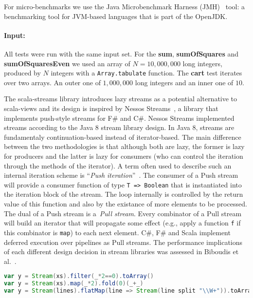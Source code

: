 For micro-benchmarks we use the Java Microbenchmark Harness
(JMH)~\cite{aleksey_shipilev_openjdk:_????} tool: a benchmarking tool for
JVM-based languages that is part of the OpenJDK.

\paragraph{Input:} All tests were run with the same input set. For the
\textbf{sum}, \textbf{sumOfSquares} and \textbf{sumOfSquaresEven} we used an
array of $N = 10,000,000$ long integers, produced by $N$ integers with a
\verb|Array.tabulate| function. The \textbf{cart} test iterates over two
arrays. An outer one of $1,000,000$ long integers and an inner one of $10$.

The scala-streams library introduces lazy streams as a potential alternative to
scala-views and its design is inspired by Nessos Streams~\cite{nessos_streams},
a library that implements push-style streams for F\# and C\#. Nessos Streams
implemented streams according to the Java 8 stream library design. In Java 8,
streams are fundamentaly continuation-based instead of iterator-based. The main
difference between the two methodologies is that although both are lazy, the
former is lazy for producers and the latter is lazy for consumers (who can
control the iteration through the methods of the iterator). A term often used to
describe such an internal iteration scheme is ``\emph{Push
  iteration}''~\cite{obsidian,defuncpush}.  The consumer of a Push stream will
provide a consumer function of type \verb|T => Boolean| that is instantiated
into the iteration block of the stream. The loop internally is controlled by the
return value of this function and also by the existance of more elements to be
processed. The dual of a Push stream is a~\emph{Pull stream}. Every combinator
of a Pull stream will build an iterator that will propagate some effect (e.g.,
apply a function \verb|f| if this combinator is \verb|map|) to each next
element. C\#, F\# and Scala implement deferred execution over pipelines as Pull
streams. The performance implications of each different design decision in
stream libraries was assessed in Biboudis et al.~\cite{biboudis_clash_2014}.

\begin{lstlisting}[language=Scala, caption=Example uses of scala-streams.]
var y = Stream(xs).filter(_*2==0).toArray()
var y = Stream(xs).map(_*2).fold(0)(_+_)
var y = Stream(lines).flatMap(line => Stream(line split "\\W+")).toArray
\end{lstlisting}

